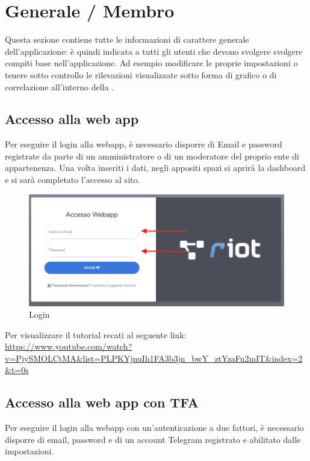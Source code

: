 \section{Generale / Membro}
Questa sezione contiene tutte le informazioni di carattere generale dell'applicazione: è quindi indicata a tutti gli utenti che devono svolgere svolgere compiti base nell'applicazione. Ad esempio modificare le proprie impostazioni o tenere sotto controllo le rilevazioni visualizzate sotto forma di grafico o di correlazione all'interno della .

\subsection{Accesso alla web app}

	Per eseguire il login alla webapp, è necessario disporre di Email e password registrate da parte di un amministratore o di un moderatore del proprio ente di appartenenza. Una volta inseriti i dati, negli appositi spazi si aprirà la dashboard e si sarà completato l'accesso al sito.

	\begin{figure}[H]
		\centering
		\includegraphics[scale=0.600]{res/images/membro/login.png}
		\caption{Login}
	\end{figure}

	Per visualizzare il tutorial recati al seguente link: 
	\url{https://www.youtube.com/watch?v=PjySMOLCtMA&list=PLPKYjnuIh1FA3b3jn_bwY_ztYzaFn2mIT&index=2&t=0s}

\subsection{Accesso alla web app con TFA}

	Per eseguire il login alla webapp con un’autenticazione a due fattori, è necessario disporre di email, password e di un account Telegram registrato e abilitato dalle impostazioni.
	
